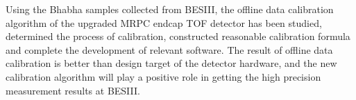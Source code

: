 \begin{englishabstract}
Using the Bhabha samples collected from BESIII, the offline data calibration algorithm of the upgraded MRPC endcap TOF detector has been studied, determined the process of calibration, constructed reasonable calibration formula and complete the development of relevant software. The result of offline data calibration is better than design target of the detector hardware, and the new calibration algorithm will play a positive role in getting the high precision measurement results at BESIII.



\end{englishabstract}

